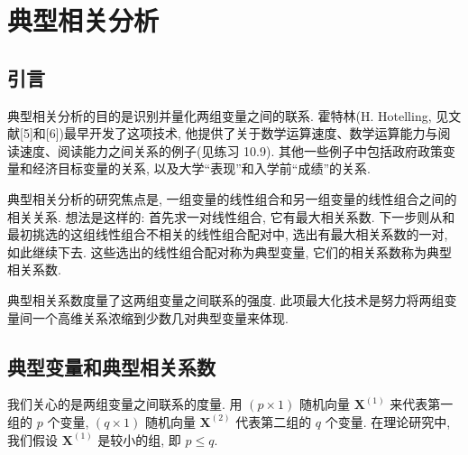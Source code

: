 
\chapter{典型相关分析}
\label{chap:10}

\section{引言}
\label{sec:10.1}

典型相关分析的目的是识别并量化两组变量之间的联系. 霍特林(H. Hotelling, 见文献[5]和[6])最早开发了这项技术, 他提供了关于数学运算速度、数学运算能力与阅读速度、阅读能力之间关系的例子(见练习 10.9). 其他一些例子中包括政府政策变量和经济目标变量的关系, 以及大学“表现”和入学前“成绩”的关系.

典型相关分析的研究焦点是, 一组变量的线性组合和另一组变量的线性组合之间的相关关系. 想法是这样的: 首先求一对线性组合, 它有最大相关系数. 下一步则从和最初挑选的这组线性组合不相关的线性组合配对中, 选出有最大相关系数的一对, 如此继续下去. 这些选出的线性组合配对称为典型变量, 它们的相关系数称为典型相关系数.

典型相关系数度量了这两组变量之间联系的强度. 此项最大化技术是努力将两组变量间一个高维关系浓缩到少数几对典型变量来体现.

\section{典型变量和典型相关系数}
\label{sec:10.2}

我们关心的是两组变量之间联系的度量. 用 $(p\times 1)$ 随机向量 $\mathbf{X}^{(1)}$ 来代表第一组的 $p$ 个变量, $(q\times 1)$ 随机向量 $\mathbf{X}^{(2)}$ 代表第二组的 $q$ 个变量. 在理论研究中, 我们假设 $\mathbf{X}^{(1)}$ 是较小的组, 即 $p\le q$.

